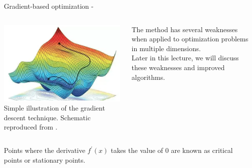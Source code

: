 \begin{frame}[t,allowframebreaks]{Gradient-based optimization -}
    \begin{columns}
        \begin{column}{0.80\textwidth}
            \begin{center}
                \includegraphics[width=0.99\textwidth]
                    {./images/grad_descent/guliyev20_grad_descent_2d.png}\\
                {\tiny 
                    Simple illustration of the gradient descent technique.
                    \color{col:attribution} 
                    Schematic reproduced from \cite{Medium:GradDescentOptLinReg}.\\
                }
            \end{center}                    
        \end{column}
        \begin{column}{0.20\textwidth}
        {\scriptsize
            The method has several weaknesses when applied to
            optimization problems in multiple dimensions.\\
            \vspace{0.2cm}
            Later in this lecture, 
            we will discuss these weaknesses and 
            improved algorithms.\\
        
        }    
        \end{column}
    \end{columns}

    \framebreak


    Points where the 
    \gls{derivative} $f^\prime(x)$ 
    takes the value of 0  are known as 
    \glspl{critical point} or 
    \glspl{stationary point}.\\


\end{frame}
